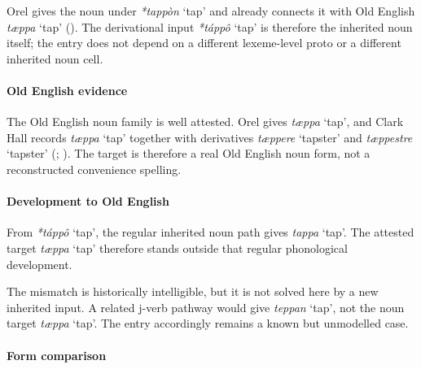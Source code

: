 \documentclass[
  british,
  a4paper,
]{article}
\providecommand{\Recon}[1]{\emph{*#1}}
\begin{document}
Orel gives the noun under \Recon{tappòn} `tap' and already connects it
with Old English {\emph{tæppa}} `tap' (). The derivational input \Recon{táppô} `tap' is therefore the
inherited noun itself; the entry does not depend on a different
lexeme-level proto or a different inherited noun cell.

\paragraph{Old English evidence}\label{old-english-evidence-154}

The Old English noun family is well attested. Orel gives {\emph{tæppa}}
`tap', and Clark Hall records {\emph{tæppa}} `tap' together with
derivatives \emph{tæppere} `tapster' and \emph{tæppestre} `tapster'
(;
). The target is
therefore a real Old English noun form, not a reconstructed convenience
spelling.

\paragraph{Development to Old
English}\label{development-to-old-english-153}

From \Recon{táppô} `tap', the regular inherited noun path gives
{\emph{tappa}} `tap'. The attested target {\emph{tæppa}} `tap' therefore
stands outside that regular phonological development.

The mismatch is historically intelligible, but it is not solved here by
a new inherited input. A related j-verb pathway would give
{\emph{teppan}} `tap', not the noun target {\emph{tæppa}} `tap'. The
entry accordingly remains a known but unmodelled case.

\paragraph{Form comparison}\label{form-comparison-5}
\end{document}
